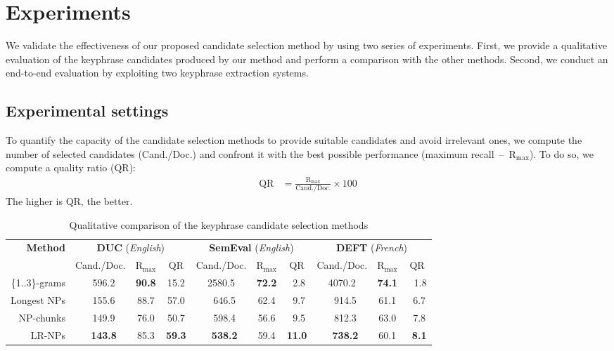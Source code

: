 \section{Experiments}
\label{sec:experiments}
    We validate the effectiveness of our proposed candidate selection method by using two series of experiments.
    First, we provide a qualitative evaluation of the keyphrase candidates produced by our method and perform a comparison with the other methods.
    Second, we conduct an end-to-end evaluation by exploiting two keyphrase extraction systems.
    
    \subsection{Experimental settings}
    \label{subsec:experimental_settings}
        To quantify the capacity of the candidate selection methods to provide suitable candidates and avoid irrelevant ones, we compute the number of selected candidates (Cand./Doc.) and confront it with the best possible performance (maximum recall~--~R$_{\text{max}}$).
        To do so, we compute a quality ratio (QR):
        \begin{align}
            \text{QR} &= \frac{\text{R$_{\text{max}}$}}{\text{Cand./Doc.}} \times 100
        \end{align}
        The higher is QR, the better.

        \begin{table*}
            \centering
            \begin{tabular}{r|ccc|ccc|ccc}
                \toprule
                \multirow{2}{*}[-2pt]{\textbf{Method}} & \multicolumn{3}{c|}{\textbf{DUC} (\textit{English})} & \multicolumn{3}{c|}{\textbf{SemEval} (\textit{English})} & \multicolumn{3}{c}{\textbf{DEFT} (\textit{French})}\\
                \cline{2-10}
                & Cand./Doc. & R$_{\text{max}}$ & QR & Cand./Doc. & R$_{\text{max}}$ & QR & Cand./Doc. & R$_{\text{max}}$ & QR\\
                \hline
                \{1..3\}-grams & $~~~$596.2 & \textbf{90.8} & 15.2 & 2580.5 & \textbf{72.2} & $~~$2.8 & 4070.2 & \textbf{74.1} & $~~~$1.8\\
                Longest NPs & $~~~$155.6 & 88.7 & 57.0 & $~~~$646.5 & 62.4 & $~~$9.7 & $~~~$914.5 & 61.1 & $~~$6.7\\
                NP-chunks & $~~~$149.9 & 76.0 & 50.7 & $~~~$598.4 & 56.6 & $~~$9.5 & $~~~$812.3 & 63.0 & $~~$7.8\\
                LR-NPs & \textbf{$~~~$143.8} & 85.3 & \textbf{59.3} & \textbf{$~~~$538.2} & 59.4 & \textbf{11.0} & \textbf{$~~~$738.2} & 60.1 & \textbf{$~~$8.1}\\
                \bottomrule
            \end{tabular}
            \caption{Qualitative comparison of the keyphrase candidate selection methods
                     \label{tab:candidate_extraction_statistics}}
        \end{table*}

